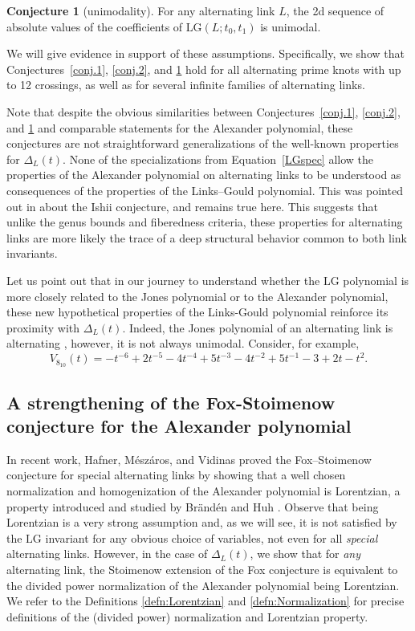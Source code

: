 \documentclass[12pt,reqno]{amsart}
\theoremstyle{definition}
\newtheorem{conjecture}[theorem]{Conjecture}
\def\LG{\mathrm{LG}}
\begin{document}
\begin{conjecture}[unimodality]\label{conj.3}
For any alternating link $L$, the 2d sequence of absolute values of the coefficients of $\LG(L ; t_0, t_1)$ is unimodal. 
\end{conjecture}

We will give evidence in support of these assumptions. Specifically, we show that Conjectures~\ref{conj.1}, \ref{conj.2}, and \ref{conj.3} hold for all alternating prime knots with up to 12 crossings, as well as for several infinite families of alternating links. 

Note that despite the obvious similarities between Conjectures~\ref{conj.1}, \ref{conj.2}, and \ref{conj.3} and comparable statements for the Alexander polynomial, these conjectures are not straightforward generalizations of the well-known properties for $\Delta_L(t)$. None of the specializations from Equation~\eqref{LGspec} allow the properties of the Alexander polynomial on alternating links to be understood as consequences of the properties of the Links--Gould polynomial. This was pointed out in \cite{Kohli2} about the Ishii conjecture, and remains true here. This suggests that unlike the genus bounds and fiberedness criteria, these properties for alternating links are more likely the trace of a deep structural behavior common to both link invariants.


Let us point out that in our journey to understand whether the $\LG$ polynomial is more closely related to the Jones polynomial or to the Alexander polynomial, these new hypothetical properties of the Links-Gould polynomial reinforce its proximity with $\Delta_L(t)$. Indeed, the Jones polynomial of an alternating link is alternating \cite{Thi}, however, it is not always unimodal. Consider, for example,
$$
V_{8_{10}}(t) = -t^{-6} +2 t^{-5} -4 t^{-4} + 5 t^{-3} -4 t^{-2} +5 t^{-1} -3 + 2t -t^2.
$$

\subsection{A strengthening of the Fox-Stoimenow conjecture for the Alexander polynomial}

In recent work, Hafner, Mészáros, and Vidinas proved the Fox--Stoimenow conjecture for special alternating links \cite{Hafner} by showing that a well chosen normalization and homogenization of the Alexander polynomial is Lorentzian, a property introduced and studied by Br{\"a}nd{\'e}n and Huh \cite{branden2020lorentzian}. Observe that being Lorentzian is a very strong assumption and, as we will see, it is not satisfied by the $\LG$ invariant for any obvious choice of variables, not even for all \emph{special} alternating links. However, in the case of $\Delta_L(t)$, we show that for \emph{any} alternating link, the Stoimenow extension of the Fox conjecture is equivalent to the {divided power normalization of the} Alexander polynomial being Lorentzian. We refer to the Definitions \ref{defn:Lorentzian} and \ref{defn:Normalization} for precise definitions of the (divided power) normalization and Lorentzian property.
\end{document}
